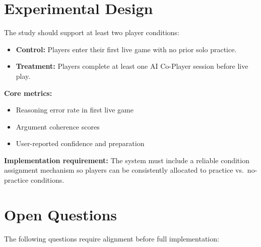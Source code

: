 \documentclass[11pt]{article}
\begin{document}
\section{Experimental Design}

The study should support at least two player conditions:

\begin{itemize}
  \item \textbf{Control:} Players enter their first live game with no prior solo practice.
  \item \textbf{Treatment:} Players complete at least one AI Co-Player session before live play.
\end{itemize}

\textbf{Core metrics:}
\begin{itemize}
  \item Reasoning error rate in first live game
  \item Argument coherence scores
  \item User-reported confidence and preparation
\end{itemize}

\textbf{Implementation requirement:} The system must include a reliable condition assignment
mechanism so players can be consistently allocated to practice vs.\ no-practice conditions.

\section{Open Questions}

The following questions require alignment before full implementation:
\end{document}
